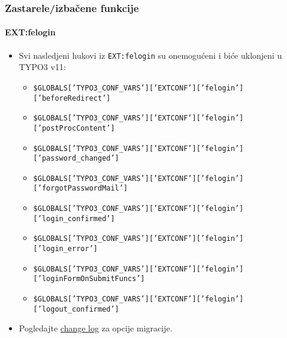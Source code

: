 \begin{frame}[fragile]
	\frametitle{Zastarele/izbačene funkcije}
	\framesubtitle{EXT:felogin}

	\lstset{basicstyle=\tiny\ttfamily}

	\begin{itemize}
		\item Svi nasledjeni hukovi iz \texttt{EXT:felogin} su onemogućeni i biće uklonjeni
			u TYPO3 v11:

			\begin{itemize}\tiny
				\item \texttt{\$GLOBALS['TYPO3\_CONF\_VARS']['EXTCONF']['felogin']['beforeRedirect']}
				\item \texttt{\$GLOBALS['TYPO3\_CONF\_VARS']['EXTCONF']['felogin']['postProcContent']}
				\item \texttt{\$GLOBALS['TYPO3\_CONF\_VARS']['EXTCONF']['felogin']['password\_changed']}
				\item \texttt{\$GLOBALS['TYPO3\_CONF\_VARS']['EXTCONF']['felogin']['forgotPasswordMail']}
				\item \texttt{\$GLOBALS['TYPO3\_CONF\_VARS']['EXTCONF']['felogin']['login\_confirmed']}
				\item \texttt{\$GLOBALS['TYPO3\_CONF\_VARS']['EXTCONF']['felogin']['login\_error']}
				\item \texttt{\$GLOBALS['TYPO3\_CONF\_VARS']['EXTCONF']['felogin']['loginFormOnSubmitFuncs']}
				\item \texttt{\$GLOBALS['TYPO3\_CONF\_VARS']['EXTCONF']['felogin']['logout\_confirmed']}
			\end{itemize}

		\item Pogledajte
			\href{https://docs.typo3.org/c/typo3/cms-core/master/en-us/Changelog/10.4/Deprecation-88740-DeprecateFeloginPibasePlugin.html}{change log}
			za opcije migracije.
	\end{itemize}

\end{frame}

